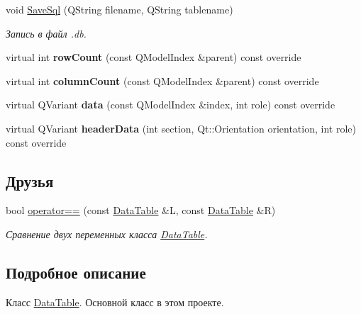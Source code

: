 \begin{DoxyCompactItemize}
$$void \mbox{\hyperlink{class_data_table_a73852c3ab4dfd0fdc6ce5e99c860824f}{Save\+Sql}} (Q\+String filename, Q\+String tablename)
\begin{DoxyCompactList}\small\item\em Запись в файл .db. \end{DoxyCompactList}\item 
\mbox{\label{class_data_table_a4e6651b3d147f8aa796195db5cb5b4db}} 
virtual int {\bfseries row\+Count} (const Q\+Model\+Index \&parent) const override
\item 
\mbox{\label{class_data_table_af9507f1dc84206a4961eee8580bbdb49}} 
virtual int {\bfseries column\+Count} (const Q\+Model\+Index \&parent) const override
\item 
\mbox{\label{class_data_table_a095037439684a30c1eb8d34d0c8a118e}} 
virtual Q\+Variant {\bfseries data} (const Q\+Model\+Index \&index, int role) const override
\item 
\mbox{\label{class_data_table_a3a99f20f29c49bde6cf4c43e60422692}} 
virtual Q\+Variant {\bfseries header\+Data} (int section, Qt\+::\+Orientation orientation, int role) const override
\end{DoxyCompactItemize}
\subsection*{Друзья}
\begin{DoxyCompactItemize}
\item 
bool \mbox{\hyperlink{class_data_table_a448d6b5189991394bc06db5950f2c8dc}{operator==}} (const \mbox{\hyperlink{class_data_table}{Data\+Table}} \&L, const \mbox{\hyperlink{class_data_table}{Data\+Table}} \&R)
\begin{DoxyCompactList}\small\item\em Сравнение двух переменных класса \mbox{\hyperlink{class_data_table}{Data\+Table}}. \end{DoxyCompactList}\end{DoxyCompactItemize}


\subsection{Подробное описание}
Класс \mbox{\hyperlink{class_data_table}{Data\+Table}}. Основной класс в этом проекте. 

